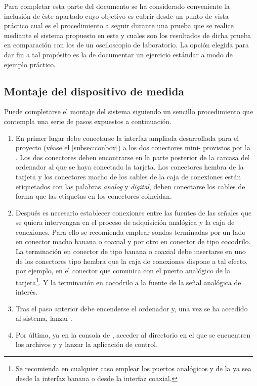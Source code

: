Para completar esta parte del documento se ha considerado conveniente la
inclusión de éste apartado cuyo objetivo es cubrir desde un punto de vista
práctico cual es el procedimiento a seguir durante una prueba que se
realice mediante el sistema propuesto en este  y cuales son los
resultados de dicha prueba en comparación con los de un osciloscopio de
laboratorio. La opción elegida para dar fin a tal propósito es la de
documentar un ejercicio estándar a modo de ejemplo práctico.


\subsection{Montaje del dispositivo de medida}

Puede completarse el montaje del sistema siguiendo un sencillo
procedimiento que contempla una serie de pasos expuestos a continuación.

\begin{enumerate}
	\item En primer lugar debe conectarse la interfaz ampliada
		desarrollada para el proyecto (véase el
		\vref{subsec:conbox}) a los dos conectores mini-
		provistos por la \kpci{}. Los dos conectores deben
		encontrarse en la parte posterior de la carcasa del
		ordenador al que se haya conectado la tarjeta. Los
		conectores hembra de la tarjeta y los conectores macho de
		los cables de la caja de conexiones están etiquetados con
		las palabras \emph{analog} y \emph{digital}, deben
		conectarse los cables de forma que las etiquetas en los
		conectores coincidan.
	\item Después es necesario establecer conexiones entre las fuentes
		de las señales que se quiera intervengan en el proceso de
		adquisición analógica y la caja de conexiones. Para ello se
		recomienda emplear sondas terminadas por un lado en
		conector macho banana o coaxial y por otro en conector de
		tipo cocodrilo. La terminación en conector de tipo banana o
		coaxial debe insertarse en uno de los conectores tipo
		hembra que la caja de conexiones dispone a tal efecto, por
		ejemplo, en el conector que comunica con el puerto
		analógico  de la tarjeta\footnote{Se recomienda
		en cualquier caso emplear los puertos analógicos 
		y  de la \kpci{} ya sea desde la interfaz banana
		o desde la interfaz coaxial.}. Y la terminación en
		cocodrilo a la fuente de la señal analógica de interés.
	\item Tras el paso anterior debe encenderse el ordenador y, una vez
		se ha accedido al sistema, lanzar \matlab{}.
	\item Por último, ya en la consola de \matlab{}, acceder al
		directorio en el que se encuentren los archivos
		 y  y
		lanzar la aplicación de control.
\end{enumerate}
